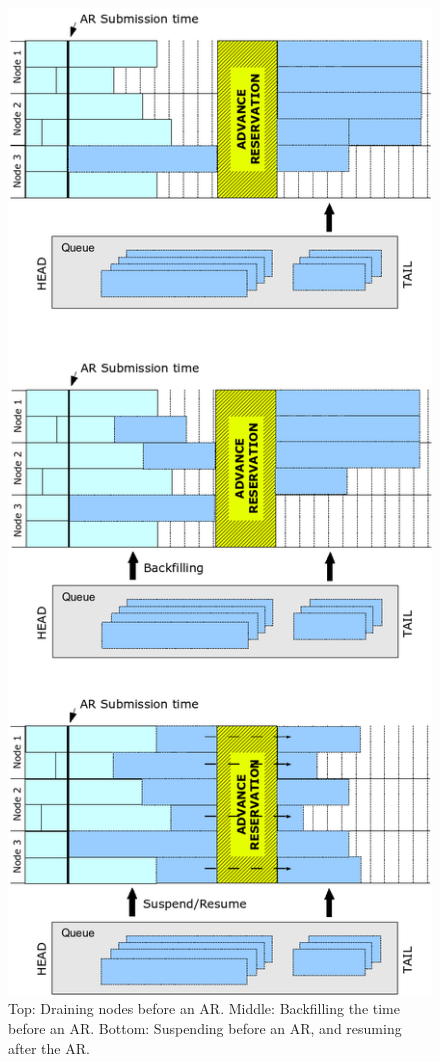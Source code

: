 \begin{figure}
  \begin{center}
    \includegraphics[height=1\textheight]{figures/arbatch.png}
    \caption{Top: Draining nodes before an AR. Middle: Backfilling the time before an AR. Bottom: Suspending before an AR, and resuming after the AR.}
	\label{fig:backfilling}
  \end{center}
\end{figure}


